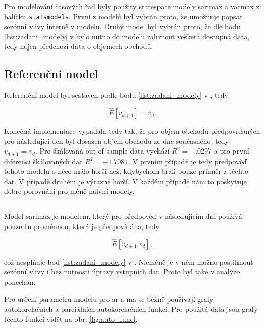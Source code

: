 \documentclass[a4paper,12pt, czech]{article}
\newcommand{\code}[1]{\texttt{#1}}
\begin{document}
Pro modelování časových řad byly použity statespace modely  \gls{sarimax} a \gls{varmax} z balíčku \code{statsmodels}.
První z modelů byl vybrán proto, že umožňuje popsat sezónní vlivy interně v modelu.
Druhý model byl vybrán proto, že dle bodu \ref{list:zadani_modely} v  bylo nutno do modelu zahrnout veškerá dostupná data, tedy nejen předchozí data o objemech obchodů.

\subsection{Referenční model}

Referenční model byl sestaven podle bodu \ref{list:zadani_modely} v , tedy

\begin{equation}\label{eq:reference}
\hat{E}\left[v_{d+1}\right] = v_d.
\end{equation}

Konečná implementace vypadala tedy tak, že pro objem obchodů předpovídaných pro následující den byl dosazen objem obchodů ze dne současného, tedy $v_{d+1} = v_d$.
Pro škálovaná out of sample data vychází $R^2=\num{-.0297}$ a pro první diferenci škálovaných dat $R^2=\num{-1.7081}$.
V prvním případě je tedy předpověď tohoto modelu o něco málo horší než, kdybychom brali pouze průměr z těchto dat.
V případě druhém je výrazně horší.
V každém případě nám to poskytuje dobré porovnání pro méně naivní modely.

\subsection{}

Model \gls{sarimax} je modelem, který pro předpověď v následujícím dni používá pouze tu proměnnou, která je předpovídána, tedy 

\begin{equation}\label{eq:sarimax}
\hat{E}\left[v_{d+1}|v_d\right],
\end{equation}

což nesplňuje bod \ref{list:zadani_modely} v .
Nicméně je v něm možno postihnout sezónní vlivy i bez nutnosti úpravy vstupních dat.
Proto byl také v analýze ponechán.

Pro určení parametrů modelu pro \gls{ar} a \gls{ma} se běžně používají grafy autokorelačních a parciálních autokorelačních funkcí.
Pro použitá data jsou grafy těchto funkcí vidět na obr. \ref{fig:auto_func}.
\end{document}
